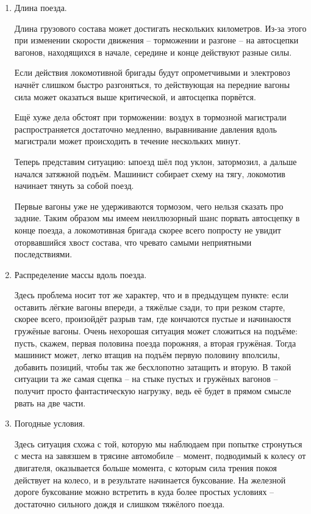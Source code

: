 \begin{itemize}
\begin{enumerate}
\item Длина поезда.

Длина грузового состава может достигать нескольких километров. Из-за этого при изменении скорости движения -- торможении и разгоне -- на автосцепки вагонов, находящихся в начале, середине и конце действуют разные силы.

Если действия локомотивной бригады будут опрометчивыми и электровоз начнёт слишком быстро разгоняться, то действующая на передние вагоны сила может оказаться выше критической, и автосцепка порвётся.

Ещё хуже дела обстоят при торможении: воздух в тормозной магистрали распространяется достаточно медленно, выравнивание давления вдоль магистрали может происходить в течение нескольких минут. 

Теперь представим ситуацию: ыпоезд шёл под уклон, затормозил, а дальше начался затяжной подъём. Машинист собирает схему на тягу, локомотив начинает тянуть за собой поезд.

Первые вагоны уже не удерживаются тормозом, чего нельзя сказать про задние. Таким образом мы имеем неиллюзорный шанс порвать автосцепку в конце поезда, а локомотивная бригада скорее всего  попросту не увидит оторвавшийся хвост состава, что чревато самыми неприятными последствиями.

\item Распределение массы вдоль поезда.

Здесь проблема носит тот же характер, что и в предыдущем пункте: если оставить лёгкие вагоны впереди, а тяжёлые сзади, то при резком старте, скорее всего, произойдёт разрыв там, где кончаются пустые и начинаюстя гружёные вагоны. Очень нехорошая ситуация может сложиться на подъёме: пусть, скажем, первая половина поезда порожняя, а вторая гружёная. Тогда машинист может, легко втащив на подъём первую половину вполсилы, добавить позиций, чтобы так же бесхлопотно затащить и вторую. В такой ситуации та же самая сцепка -- на стыке пустых и гружёных вагонов -- получит просто фантастическую нагрузку, ведь её будет в прямом смысле рвать на две части.

\item Погодные условия.

Здесь ситуация схожа с той, которую мы наблюдаем при попытке стронуться с места на завязшем в трясине автомобиле -- момент, подводимый к колесу от двигателя, оказывается больше момента, с которым сила трения покоя действует на колесо, и в результате начинается буксование. На железной дороге буксование можно встретить в куда более простых условиях -- достаточно сильного дождя и слишком тяжёлого поезда.


\end{enumerate}
\end{itemize}
